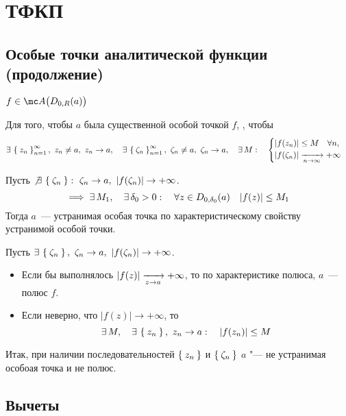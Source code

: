 \chapter{ТФКП}

\section{Особые точки аналитической функции (продолжение)}

\begin{theorem}
	$ f \in \mc A \big( D_{0, R}(a) \big) $

	Для того, чтобы $ a $ была существенной особой точкой $ f $, , чтобы
	$$ \exists\, \Set{z_n}_{n=1}^{\infty}, ~ z_n \ne a, ~ z_n \to a, \quad \exists\, \Set{\zeta_n}_{n=1}^{\infty}, ~ \zeta_n \ne a, ~ \zeta_n \to a, \quad \exists\, M : \quad
	\begin{cases}
		|f(z_n)| \le M \quad \forall n, \\
		|f(\zeta_n)| \xrightarrow[n \to \infty]{} +\infty
	\end{cases} $$
\end{theorem}

\begin{iproof}
	\item Пусть $ \not\exists\, \Set{\zeta_n} : ~ \zeta_n \to a, ~ |f(\zeta_n)| \to +\infty $.
	$$ \implies \exists\, M_1, \quad \exists\, \delta_0 > 0 : \quad \forall z \in D_{0, \delta_0}(a) \quad |f(z)| \le M_1 $$
	Тогда $ a $~--- устранимая особая точка по характеристическому свойству устранимой особой точки.

	\item Пусть $ \exists\, \Set{\zeta_n}, ~ \zeta_n \to a, ~ |f(\zeta_n)| \to +\infty $.
	\begin{itemize}
		\item Если бы выполнялось $ |f(z)| \xrightarrow[z \to a]{} +\infty $, то по характеристике полюса, $ a $~--- полюс $ f $.
		\item Если неверно, что $ |f(z)| \to +\infty $, то
		$$ \exists\, M, \quad \exists\, \Set{z_n}, ~ z_n \to a : \quad |f(z_n)| \le M $$
	\end{itemize}

	Итак, при наличии последовательностей $ \Set{z_n} $ и $ \Set{\zeta_n} $ $ a $ "--- не устранимая особоая точка и не полюс.
\end{iproof}

\section{Вычеты}

